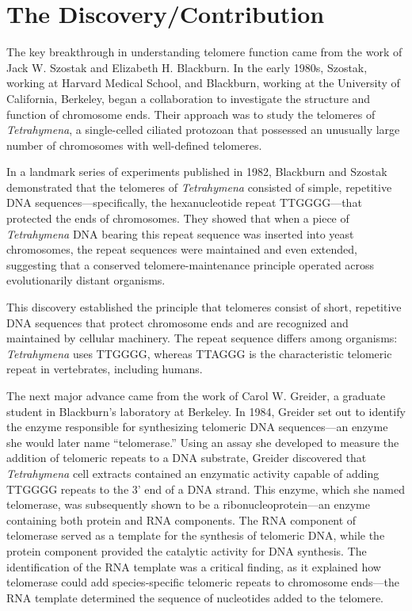 \section{The Discovery/Contribution}

The key breakthrough in understanding telomere function came from the work of Jack W. Szostak and Elizabeth H. Blackburn. In the early 1980s, Szostak, working at Harvard Medical School, and Blackburn, working at the University of California, Berkeley, began a collaboration to investigate the structure and function of chromosome ends. Their approach was to study the telomeres of \textit{Tetrahymena}, a single-celled ciliated protozoan that possessed an unusually large number of chromosomes with well-defined telomeres.

In a landmark series of experiments published in 1982, Blackburn and Szostak demonstrated that the telomeres of \textit{Tetrahymena} consisted of simple, repetitive DNA sequences---specifically, the hexanucleotide repeat TTGGGG---that protected the ends of chromosomes. They showed that when a piece of \textit{Tetrahymena} DNA bearing this repeat sequence was inserted into yeast chromosomes, the repeat sequences were maintained and even extended, suggesting that a conserved telomere-maintenance principle operated across evolutionarily distant organisms.

This discovery established the principle that telomeres consist of short, repetitive DNA sequences that protect chromosome ends and are recognized and maintained by cellular machinery. The repeat sequence differs among organisms: \textit{Tetrahymena} uses TTGGGG, whereas TTAGGG is the characteristic telomeric repeat in vertebrates, including humans.

The next major advance came from the work of Carol W. Greider, a graduate student in Blackburn's laboratory at Berkeley. In 1984, Greider set out to identify the enzyme responsible for synthesizing telomeric DNA sequences---an enzyme she would later name ``telomerase.'' Using an assay she developed to measure the addition of telomeric repeats to a DNA substrate, Greider discovered that \textit{Tetrahymena} cell extracts contained an enzymatic activity capable of adding TTGGGG repeats to the 3' end of a DNA strand. This enzyme, which she named telomerase, was subsequently shown to be a ribonucleoprotein---an enzyme containing both protein and RNA components. The RNA component of telomerase served as a template for the synthesis of telomeric DNA, while the protein component provided the catalytic activity for DNA synthesis. The identification of the RNA template was a critical finding, as it explained how telomerase could add species-specific telomeric repeats to chromosome ends---the RNA template determined the sequence of nucleotides added to the telomere.

